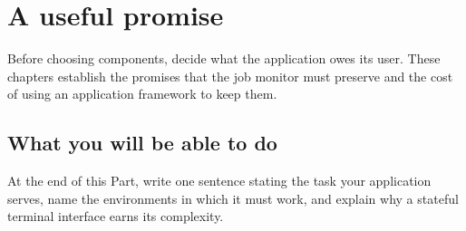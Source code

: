 \chapter*{A useful promise}

Before choosing components, decide what the application owes its user. These chapters establish the promises that the job monitor must preserve and the cost of using an application framework to keep them.

\section*{What you will be able to do}

At the end of this Part, write one sentence stating the task your application serves, name the environments in which it must work, and explain why a stateful terminal interface earns its complexity.
